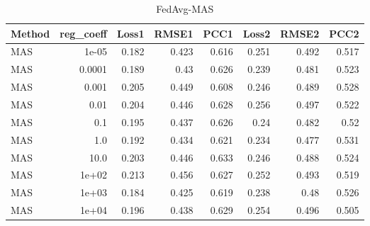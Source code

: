 \begin{table}
\caption{FedAvg-MAS}
\begin{tabular}{lrrrrrrr}
\toprule
Method & reg_coeff & Loss1 & RMSE1 & PCC1 & Loss2 & RMSE2 & PCC2 \\
\midrule
MAS & 1e-05 & 0.182 & 0.423 & 0.616 & 0.251 & 0.492 & 0.517 \\
MAS & 0.0001 & 0.189 & 0.43 & 0.626 & 0.239 & 0.481 & 0.523 \\
MAS & 0.001 & 0.205 & 0.449 & 0.608 & 0.246 & 0.489 & 0.528 \\
MAS & 0.01 & 0.204 & 0.446 & 0.628 & 0.256 & 0.497 & 0.522 \\
MAS & 0.1 & 0.195 & 0.437 & 0.626 & 0.24 & 0.482 & 0.52 \\
MAS & 1.0 & 0.192 & 0.434 & 0.621 & 0.234 & 0.477 & 0.531 \\
MAS & 10.0 & 0.203 & 0.446 & 0.633 & 0.246 & 0.488 & 0.524 \\
MAS & 1e+02 & 0.213 & 0.456 & 0.627 & 0.252 & 0.493 & 0.519 \\
MAS & 1e+03 & 0.184 & 0.425 & 0.619 & 0.238 & 0.48 & 0.526 \\
MAS & 1e+04 & 0.196 & 0.438 & 0.629 & 0.254 & 0.496 & 0.505 \\
\bottomrule
\end{tabular}
\end{table}
